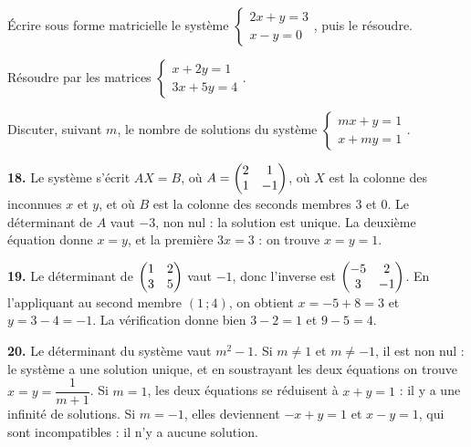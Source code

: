 \begin{entrainement}[systèmes]
\exo[\niveau{1}] Écrire sous forme matricielle le système
$\begin{cases} 2x+y = 3 \\ x-y = 0 \end{cases}$, puis le résoudre.

\exo[\niveau{2}] Résoudre par les matrices
$\begin{cases} x+2y = 1 \\ 3x+5y = 4 \end{cases}$.

\exo[\niveau{3}] Discuter, suivant $m$, le nombre de solutions du système
$\begin{cases} mx+y = 1 \\ x+my = 1 \end{cases}$.
\end{entrainement}

\begin{corrige}
\textbf{18.} Le système s'écrit $AX = B$, où
$A = \begin{pmatrix} 2 & 1 \\ 1 & -1 \end{pmatrix}$, où $X$ est la colonne des inconnues $x$ et $y$,
et où $B$ est la colonne des seconds membres $3$ et $0$. Le déterminant de
$A$ vaut $-3$, non nul : la solution est unique. La deuxième équation donne
$x = y$, et la première $3x = 3$ : on trouve $x = y = 1$.

\textbf{19.} Le déterminant de $\begin{pmatrix} 1 & 2 \\ 3 & 5 \end{pmatrix}$ vaut $-1$, donc
l'inverse est $\begin{pmatrix} -5 & 2 \\ 3 & -1 \end{pmatrix}$. En l'appliquant au second membre
$(1\,;4)$, on obtient $x = -5+8 = 3$ et $y = 3-4 = -1$. La vérification
donne bien $3-2 = 1$ et $9-5 = 4$.

\textbf{20.} Le déterminant du système vaut $m^{2}-1$. Si $m \neq 1$ et
$m \neq -1$, il est non nul : le système a une solution unique, et en
soustrayant les deux équations on trouve $x = y = \dfrac{1}{m+1}$. Si
$m = 1$, les deux équations se réduisent à $x+y = 1$ : il y a une infinité de
solutions. Si $m = -1$, elles deviennent $-x+y = 1$ et $x-y = 1$, qui sont
incompatibles : il n'y a aucune solution.
\end{corrige}

